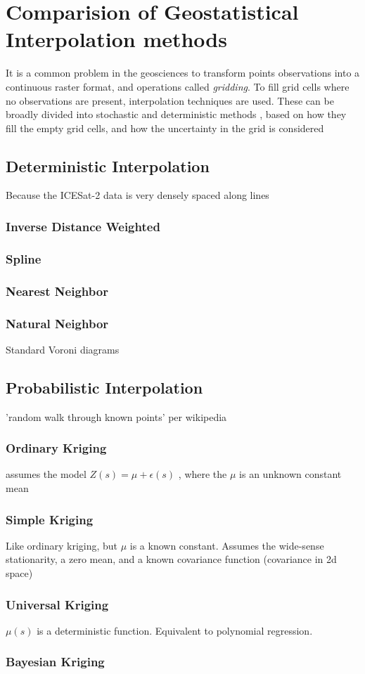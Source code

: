 \chapter{Comparision of Geostatistical Interpolation methods}
It is a common problem in the geosciences to transform points observations into a continuous raster format, and operations called \emph{gridding}. To fill grid cells where no observations are present, interpolation techniques are used. These can be broadly divided into stochastic and deterministic methods \parencite{}, based on how they fill the empty grid cells, and how the uncertainty in the grid is considered 

\section{Deterministic Interpolation}
Because the ICESat-2 data is very densely spaced along lines
\subsection{Inverse Distance Weighted}
\subsection{Spline}
\subsection{Nearest Neighbor}

\subsection{Natural Neighbor}
Standard Voroni diagrams

\section{Probabilistic Interpolation}
'random walk through known points' per wikipedia
\subsection{Ordinary Kriging}
assumes the model $Z(s) = \mu + \epsilon(s)$ \parencite{esri site}, where the $\mu$ is an unknown constant mean

\subsection{Simple Kriging}
Like ordinary kriging, but $\mu$ is a known constant. Assumes the wide-sense stationarity, a zero mean, and a known covariance function (covariance in 2d space)
\subsection{Universal Kriging}
$\mu(s)$ is a deterministic function. Equivalent to polynomial regression. 
\subsection{Bayesian Kriging}